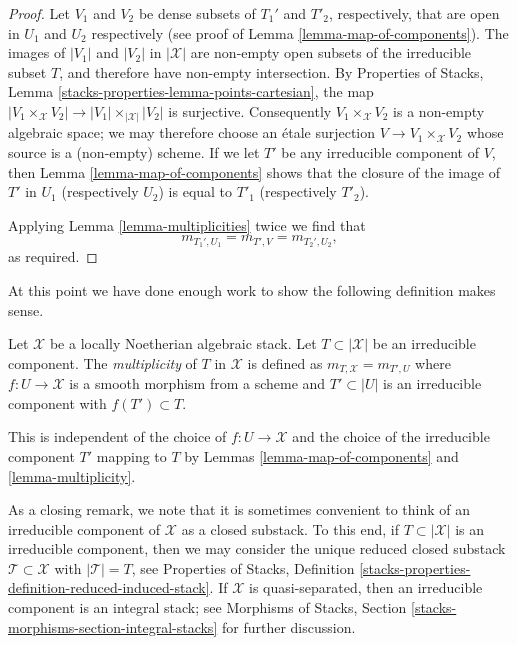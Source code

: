 \begin{proof}
Let $V_1$ and $V_2$ be dense subsets of $T_1'$ and $T'_2$, respectively,
that are open in $U_1$ and $U_2$ respectively (see proof of
Lemma \ref{lemma-map-of-components}).
The images of $|V_1|$ and $|V_2|$ in $|\mathcal{X}|$ are non-empty open
subsets of the irreducible subset $T$, and therefore have non-empty
intersection. By
Properties of Stacks, Lemma \ref{stacks-properties-lemma-points-cartesian},
the map $|V_1 \times_\mathcal{X} V_2| \to |V_1| \times_{|\mathcal{X}|} |V_2|$
is surjective. Consequently $V_1 \times_\mathcal{X} V_2$
is a non-empty algebraic space; we may therefore choose an
\'etale surjection $V \to V_1 \times_\mathcal{X} V_2$
whose source is a (non-empty) scheme.
If we let $T'$ be any irreducible component of $V$,
then Lemma \ref{lemma-map-of-components} shows that the closure of
the image of $T'$ in $U_1$ (respectively $U_2$) is equal to $T'_1$
(respectively $T'_2$).

\medskip\noindent
Applying Lemma \ref{lemma-multiplicities} twice we find
that
$$
m_{T_1', U_1} = m_{T', V} = m_{T_2', U_2},
$$
as required.
\end{proof}

\noindent
At this point we have done enough work to show the following
definition makes sense.

\begin{definition}
\label{definition-multiplicity}
Let $\mathcal{X}$ be a locally Noetherian algebraic stack. Let
$T \subset |\mathcal{X}|$ be an irreducible component.
The {\it multiplicity} of $T$ in $\mathcal{X}$ is defined as
$m_{T, \mathcal{X}} = m_{T', U}$ where $f : U \to \mathcal{X}$
is a smooth morphism from a scheme and $T' \subset |U|$
is an irreducible component with $f(T') \subset T$.
\end{definition}

\noindent
This is independent of the choice of $f : U \to \mathcal{X}$
and the choice of the irreducible component $T'$ mapping to $T$
by Lemmas \ref{lemma-map-of-components} and \ref{lemma-multiplicity}.

\medskip\noindent
As a closing remark, we note that it is sometimes convenient to think
of an irreducible component of $\mathcal{X}$ as a closed substack.
To this end, if $T \subset |\mathcal{X}|$ is an irreducible component,
then we may consider the unique reduced closed substack
$\mathcal{T} \subset \mathcal{X}$ with $|\mathcal{T}| = T$, see
Properties of Stacks, Definition
\ref{stacks-properties-definition-reduced-induced-stack}.
If $\mathcal{X}$ is quasi-separated, then
an irreducible component is an integral stack; see
Morphisms of Stacks, Section \ref{stacks-morphisms-section-integral-stacks}
for further discussion.



